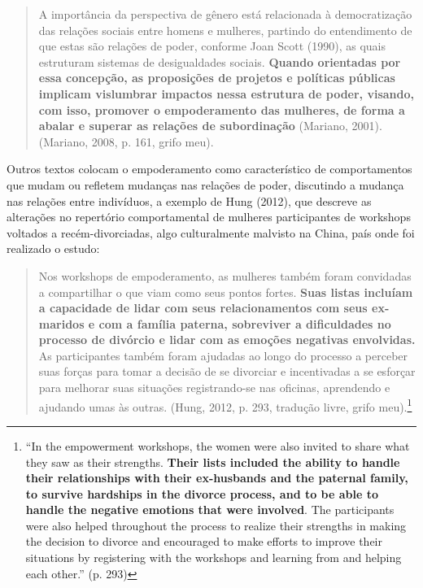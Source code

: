 \begin{quote}
    A importância da perspectiva de gênero está relacionada à democratização das relações sociais entre homens e mulheres, partindo do entendimento de que estas são relações de poder, conforme Joan Scott (1990), as quais estruturam sistemas de desigualdades sociais. \textbf{Quando orientadas por essa concepção, as proposições de projetos e políticas públicas implicam vislumbrar impactos nessa estrutura de poder, visando, com isso, promover o empoderamento das mulheres, de forma a abalar e superar as relações de subordinação} (Mariano, 2001). (Mariano, 2008, p. 161, grifo meu).
\end{quote}

Outros textos colocam o empoderamento como característico de comportamentos que mudam ou refletem mudanças nas relações de poder, discutindo a mudança nas relações entre indivíduos, a exemplo de Hung (2012), que descreve as alterações no repertório comportamental de mulheres participantes de workshops voltados a recém-divorciadas, algo culturalmente malvisto na China, país onde foi realizado o estudo:

\begin{quote}
    Nos workshops de empoderamento, as mulheres também foram convidadas a compartilhar o que viam como seus pontos fortes. \textbf{Suas listas incluíam a capacidade de lidar com seus relacionamentos com seus ex-maridos e com a família paterna, sobreviver a dificuldades no processo de divórcio e lidar com as emoções negativas envolvidas.} As participantes também foram ajudadas ao longo do processo a perceber suas forças para tomar a decisão de se divorciar e incentivadas a se esforçar para melhorar suas situações registrando-se nas oficinas, aprendendo e ajudando umas às outras. (Hung, 2012, p. 293, tradução livre, grifo meu).\footnote{``In the empowerment workshops, the women were also invited to share what they saw as their strengths. \textbf{Their lists included the ability to handle their relationships with their ex-husbands and the paternal family, to survive hardships in the divorce process, and to be able to handle the negative emotions that were involved}. The participants were also helped throughout the process to realize their strengths in making the decision to divorce and encouraged to make efforts to improve their situations by registering with the workshops and learning from and helping each other.'' (p. 293)}
\end{quote}

